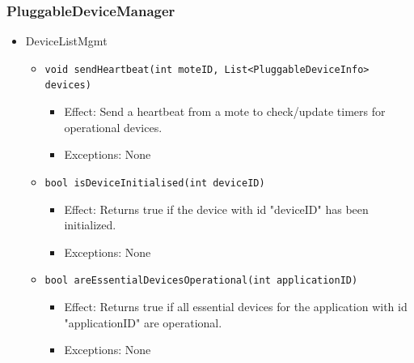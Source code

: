     \subsubsection{PluggableDeviceManager}
    \begin{itemize}
    	\item DeviceListMgmt
    	\begin{itemize}
    		\item \texttt{void sendHeartbeat(int moteID, List<PluggableDeviceInfo> devices)}
    		\begin{itemize}
    			\item Effect: Send a heartbeat from a mote to check/update timers for operational devices.
    			\item Exceptions: None
    		\end{itemize}
    		\item \texttt{bool isDeviceInitialised(int deviceID)}
    		\begin{itemize}
    			\item Effect: Returns true if the device with id "deviceID" has been initialized.
    			\item Exceptions: None
    		\end{itemize}
    		\item \texttt{bool areEssentialDevicesOperational(int applicationID)}
    		\begin{itemize}
    			\item Effect: Returns true if all essential devices for the application
                              with id "applicationID" are operational.
    			\item Exceptions: None
    		\end{itemize}
    	\end{itemize}
    \end{itemize}

